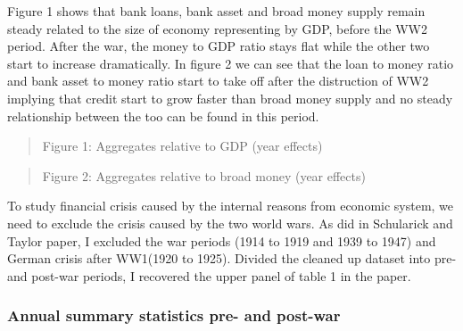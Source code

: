 \documentclass{article}
\newcommand{\ciapdf}[1]{\vspace*{-\parskip}\begin{center}\resizebox{0.75\textwidth}{!}{\texttt{[image: \#1]}}\end{center}}
\begin{document}
Figure 1 shows that bank loans, bank asset and broad money supply remain
steady related to the size of economy representing by GDP,
before the WW2 period. After the war, the money to GDP ratio stays flat
while the other two start to increase dramatically. In figure 2 we
can see that the loan to money ratio and bank asset to money ratio start
to take off after the distruction of WW2 implying that credit start to
grow faster than broad money supply and no steady relationship between
the too can be found in this period.

\ciapdf{Figure_2.pdf}

\begin{quote}
Figure 1: Aggregates relative to GDP (year effects)
\end{quote}

\ciapdf{Figure_1.pdf}

\begin{quote}
Figure 2: Aggregates relative to broad money (year effects)
\end{quote}

To study financial crisis caused by the internal reasons from economic system,
we need to
exclude the crisis caused by the two world wars. As did in Schularick and
Taylor paper, I excluded the war periods (1914 to 1919 and 1939 to 1947)
and German crisis after WW1(1920 to 1925). Divided the cleaned up
dataset into pre- and post-war periods, I recovered the upper panel of
table 1 in the paper.

\subsubsection*{Annual summary statistics pre- and post-war}
\end{document}
